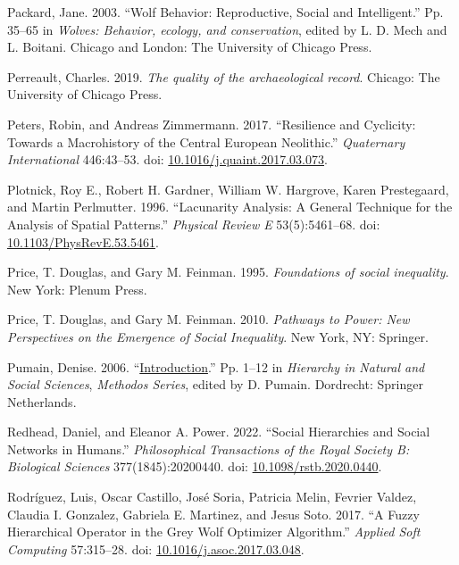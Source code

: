 \documentclass[
  12pt,
]{book}
\newlength{\cslhangindent}
\newlength{\cslentryspacingunit} %
\newenvironment{CSLReferences}[2] %
 {%
  \setlength{\parindent}{0pt}
  \ifodd #1
  \let\oldpar\par
  \def\par{\hangindent=\cslhangindent\oldpar}
  \fi
  \setlength{\parskip}{#2\cslentryspacingunit}
 }%
 {}
\begin{document}
\begin{CSLReferences}{1}{0}
\leavevmode{}%
Packard, Jane. 2003. {``Wolf Behavior: Reproductive, Social and Intelligent.''} Pp. 35--65 in \emph{Wolves: Behavior, ecology, and conservation}, edited by L. D. Mech and L. Boitani. {Chicago and London}: {The University of Chicago Press}.

\leavevmode{}%
Perreault, Charles. 2019. \emph{The quality of the archaeological record}. Chicago: The University of Chicago Press.

\leavevmode{}%
Peters, Robin, and Andreas Zimmermann. 2017. {``Resilience and Cyclicity: Towards a Macrohistory of the Central European Neolithic.''} \emph{Quaternary International} 446:43--53. doi: \href{https://doi.org/10.1016/j.quaint.2017.03.073}{10.1016/j.quaint.2017.03.073}.

\leavevmode{}%
Plotnick, Roy E., Robert H. Gardner, William W. Hargrove, Karen Prestegaard, and Martin Perlmutter. 1996. {``Lacunarity Analysis: A General Technique for the Analysis of Spatial Patterns.''} \emph{Physical Review E} 53(5):5461--68. doi: \href{https://doi.org/10.1103/PhysRevE.53.5461}{10.1103/PhysRevE.53.5461}.

\leavevmode{}%
Price, T. Douglas, and Gary M. Feinman. 1995. \emph{Foundations of social inequality}. New York: Plenum Press.

\leavevmode{}%
Price, T. Douglas, and Gary M. Feinman. 2010. \emph{Pathways to Power: New Perspectives on the Emergence of Social Inequality}. New York, NY: Springer.

\leavevmode{}%
Pumain, Denise. 2006. {``\href{https://doi.org/10.1007/1-4020-4127-6_1}{Introduction}.''} Pp. 1--12 in \emph{Hierarchy in {Natural} and {Social Sciences}}, \emph{Methodos {Series}}, edited by D. Pumain. {Dordrecht}: {Springer Netherlands}.

\leavevmode{}%
Redhead, Daniel, and Eleanor A. Power. 2022. {``Social Hierarchies and Social Networks in Humans.''} \emph{Philosophical Transactions of the Royal Society B: Biological Sciences} 377(1845):20200440. doi: \href{https://doi.org/10.1098/rstb.2020.0440}{10.1098/rstb.2020.0440}.

\leavevmode{}%
Rodríguez, Luis, Oscar Castillo, José Soria, Patricia Melin, Fevrier Valdez, Claudia I. Gonzalez, Gabriela E. Martinez, and Jesus Soto. 2017. {``A Fuzzy Hierarchical Operator in the Grey Wolf Optimizer Algorithm.''} \emph{Applied Soft Computing} 57:315--28. doi: \href{https://doi.org/10.1016/j.asoc.2017.03.048}{10.1016/j.asoc.2017.03.048}.


\end{CSLReferences}
\end{document}
